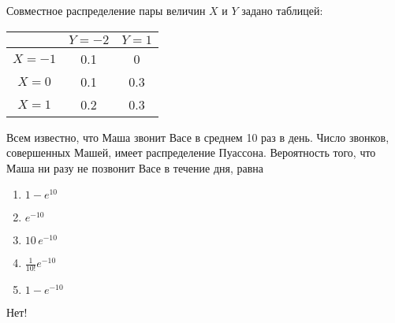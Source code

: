 \documentclass[t]{beamer}
\begin{document}
 \begin{frame} \label{13-No} 
\begin{block}{13} 

Совместное распределение пары величин $X$ и $Y$ задано таблицей:

\begin{center}
\begin{tabular}{c|cc}
 & $Y=-2$ & $Y=1$ \\
\hline
$X=-1$ & 0.1 & 0 \\
$X=0$ & 0.1 & 0.3 \\
$X=1$ & 0.2 & 0.3 \\
\end{tabular}
\end{center}
\vspace{0.2cm} 
 
 Всем известно, что Маша звонит Васе в среднем 10 раз в день. Число звонков, совершенных Машей, имеет распределение Пуассона. Вероятность того, что Маша ни разу не позвонит Васе в течение дня, равна
 


 \end{block} 
\begin{enumerate} 
\item[] \hyperlink{13-No}{\beamergotobutton{} $1 - e^{10}$}
\item[] \hyperlink{13-Yes}{\beamergotobutton{} $e^{-10}$}
\item[] \hyperlink{13-No}{\beamergotobutton{} $10\,e^{-10}$}
\item[] \hyperlink{13-No}{\beamergotobutton{} $\tfrac{1}{10!}e^{-10}$}
\item[] \hyperlink{13-No}{\beamergotobutton{} $1 - e^{-10}$}
\end{enumerate} 

 \alert{Нет!} 
\end{frame} 
\end{document}
